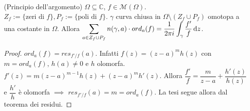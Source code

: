 \begin{thm}
  (Principio dell'argomento) $\Omega \subseteq \mathbb{C}$, $f \in \mathcal{M}(\Omega)$. $Z_f:=\{\text{zeri di } f\}, P_f:=\{\text{poli di } f\}$. $\gamma$ curva chiusa in $\Omega \setminus (Z_f \cup P_f)$ omotopa a una costante in $\Omega$.
  Allora $\displaystyle \sum_{a \in Z_f \cup P_f} n(\gamma, a) \cdot ord_a(f)=\frac{1}{2\pi i}\int_{\gamma} \frac{f'}{f} \mathop{}\!\mathrm{d} z$.
\end{thm}

\begin{proof}
  $ord_a(f)=res_{f'/f}(a)$. Infatti $f(z)=(z-a)^mh(z)$ con $m=ord_a(f)$, $h(a) \not=0$ e $h$ olomorfa. $f'(z)=m(z-a)^{m-1}h(z)+(z-a)^mh'(z)$. Allora $\dfrac{f'}{f}=\dfrac{m}{z-a}+\dfrac{h'(z)}{h(z)}$ e $\dfrac{h'}{h}$ è olomorfa $\implies$ $res_{f'/f}(a)=m=ord_a(f)$. La tesi segue allora dal teorema dei residui.
\end{proof}
